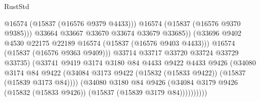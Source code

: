 \begin{lexlean}{RustStd}
\begin{coremodule}
{\begin{coremodule}
{{{{{{{{{{{{{{{{{{{{{{{{{{{{{{{{{{{{{{{{{{{{{{{{{{{{{{{{{{{{                                                @16574
                                                (@15837 (@16576 @9379 @4433)))
                                              @16574
                                              (@15837 (@16576 @9370 @9385)))
                                            @33664
                                            @33667
                                            @33670
                                            @33674
                                            @33679
                                            @33685))
                                        (@33696
                                          @9402
                                          @4530
                                          @22175
                                          @22189
                                          @16574
                                          (@15837 (@16576 @9403 @4433)))
                                        @16574
                                        (@15837 (@16576 @9363 @9409)))
                                      @33714
                                      @33717
                                      @33720
                                      @33724
                                      @33729
                                      @33735)
                                    (@33741
                                      @9419
                                      @3174
                                      @3180
                                      @84
                                      @4433
                                      @9422
                                      @4433
                                      @9426
                                      (@34080
                                        @3174
                                        @84
                                        @9422
                                        (@34084
                                          @3173
                                          @9422
                                          (@15832 (@15833 @9422))
                                          (@15837 (@15839 @3173 @84))))
                                      (@34080
                                        @3180
                                        @84
                                        @9426
                                        (@34084
                                          @3179
                                          @9426
                                          (@15832 (@15833 @9426))
                                          (@15837 (@15839 @3179 @84))))))))))
}}}}}}}}}}}}}}}}}}}}}}}}}}}}}}}}}}}}}}}}}}}}}}}}}}}}}}}}}}}}
\end{coremodule}}
\end{coremodule}
\end{lexlean}
